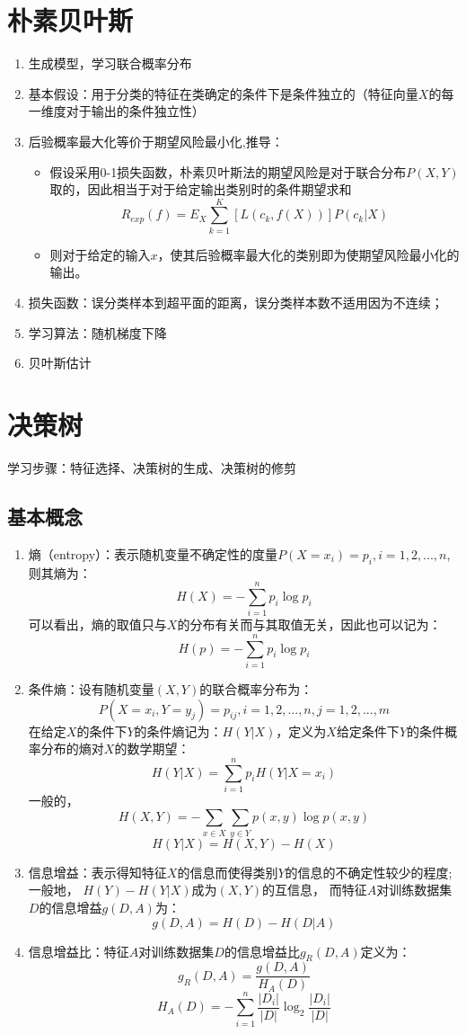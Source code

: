 \documentclass[UTF8]{article}%
\begin{document}
	\section{朴素贝叶斯}
		\begin{enumerate}
			\item 生成模型，学习联合概率分布
			\item 基本假设：用于分类的特征在类确定的条件下是条件独立的（特征向量$X$的每一维度对于输出的条件独立性）
			\item 后验概率最大化等价于期望风险最小化,推导：
			\begin{itemize}
				\item 假设采用0-1损失函数，朴素贝叶斯法的期望风险是对于联合分布$P(X,Y)$取的，因此相当于对于给定输出类别时的条件期望求和$$R_{exp}(f)=E_X\sum\limits_{k=1}^K[L(c_k,f(X))]P(c_k|X)$$
				\item 则对于给定的输入$x$，使其后验概率最大化的类别即为使期望风险最小化的输出。
			\end{itemize}
		\item 损失函数：误分类样本到超平面的距离，误分类样本数不适用因为不连续；
		\item 学习算法：随机梯度下降
		\item 贝叶斯估计
		
	\end{enumerate}

	\section{决策树}
	学习步骤：特征选择、决策树的生成、决策树的修剪
	\subsection{基本概念}
		\begin{enumerate}
			\item 熵（entropy）：表示随机变量不确定性的度量$P(X=x_i)=p_i, i=1,2,...,n$,则其熵为：$$H(X)=-\sum\limits_{i=1}^n p_i\log p_i$$
			可以看出，熵的取值只与$X$的分布有关而与其取值无关，因此也可以记为：$$H(p)=-\sum\limits_{i=1}^n p_i\log p_i$$
			\item 条件熵：设有随机变量$(X,Y)$的联合概率分布为：$$P(X=x_i,Y=y_j)=p_{ij}, i=1,2,...,n, j=1,2,...,m$$
			在给定$X$的条件下$Y$的条件熵记为：$H(Y|X)$，定义为$X$给定条件下$Y$的条件概率分布的熵对$X$的数学期望：
			$$H(Y|X)=\sum\limits_{i=1}^n p_iH(Y|X=x_i)$$
			一般的，$$H(X,Y)=-\sum\limits_{x\in X} \sum\limits_{y \in Y } p(x,y)\log p(x,y)$$
			$$H(Y|X)=H(X,Y)-H(X) $$
			\item 信息增益：表示得知特征$X$的信息而使得类别$Y$的信息的不确定性较少的程度;一般地，
			$H(Y)-H(Y|X)$成为$(X,Y)$的互信息，	而特征$A$对训练数据集$D$的信息增益$g(D,A)$为：$$g(D,A)=H(D)-H(D|A)$$
			\item 信息增益比：特征$A$对训练数据集$D$的信息增益比$g_R(D,A)$定义为：
			$$g_R(D,A)=\frac{g(D,A)}{H_A(D)}$$
			$${H_A(D)}=-\sum_{i=1}^{n}\frac{|D_i|}{|D|}\log_2\frac{|D_i|}{|D|}$$
		\end{enumerate}
\end{document}
